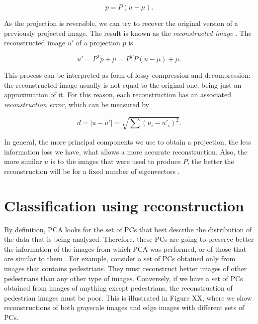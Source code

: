 \documentclass[10pt, conference, compsocconf]{IEEEtran}
\begin{document}
\begin{equation}
  p = P (u - \mu).
\end{equation}

\noindent As the projection is reversible, we can try to recover the original version of a previously projected image. The result is known as the \emph{reconstructed image} \cite{borja09}. The reconstructed image $u'$ of a projection $p$ is

\begin{equation}
  u' = P^Tp + \mu = P^T P(u - \mu) + \mu.
\end{equation}

\noindent This process can be interpreted as form of lossy compression and decompression: the reconstructed image usually is not equal to the original one, being just an approximation of it. For this reason, each reconstruction has an associated \emph{reconstruction error}, which can be measured by

\begin{equation}
  d = |u - u'| = \sqrt{\sum{(u_i - u'_i)^2}}.
\end{equation}

In general, the more principal components we use to obtain a projection, the less information loss we have, what allows a more accurate reconstruction. Also, the more similar $u$ is to the images that were used to produce $P$, the better the reconstruction will be for a fixed number of eigenvectors \cite{borja09}.


\section{Classification using reconstruction}

By definition, PCA looks for the set of PCs that best describe the distribution of the data that is being analyzed. Therefore, these PCs are going to preserve better the information of the images from which PCA was performed, or of those that are similar to them \cite{borja09}. For example, consider a set of PCs obtained only from images that contains pedestrians. They must reconstruct better images of other pedestrians than any other type of images. Conversely, if we have a set of PCs obtained from images of anything except pedestrians, the reconstruction of pedestrian images must be poor. This is illustrated in Figure XX, where we show reconstructions of both grayscale images and edge images with different sets of PCs.

\end{document}
